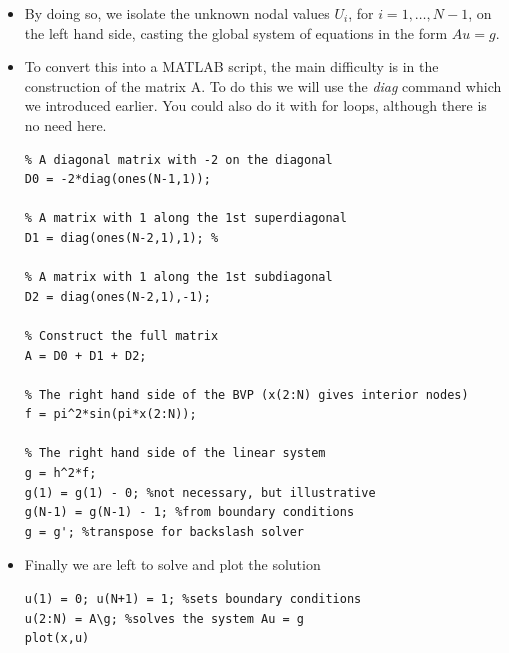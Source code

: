\documentclass[12pt]{report}
\begin{document}
\begin{itemize}
\begin{displaymath}
\begin{matrix}
f_2 \\
f_3 \\
\vdots \\
f_{N-3} \\
f_{N-2} \\
f_{N-1} \\
\end{matrix}\right) - 
u(0)\left(\begin{matrix}
1 \\
0 \\
0 \\
\vdots \\
0 \\
0 \\
0 \\
\end{matrix}\right) - 
u(1)\left(\begin{matrix}
0 \\
0 \\
0 \\
\vdots \\
0 \\
0 \\
1 \\
\end{matrix}\right)
\end{displaymath}
\item By doing so, we isolate the unknown nodal values $U_i$, for $i = 1,\ldots,N−1$, on the left hand side, casting the global system of equations in the form $Au = g$.
\item To convert this into a MATLAB script, the main difficulty is in the construction of the matrix A. To do this we will use the \textit{diag} command which we introduced earlier. You could also do it with for loops, although there is no need here.
\begin{lstlisting}
% A diagonal matrix with -2 on the diagonal
D0 = -2*diag(ones(N-1,1));

% A matrix with 1 along the 1st superdiagonal
D1 = diag(ones(N-2,1),1); %

% A matrix with 1 along the 1st subdiagonal
D2 = diag(ones(N-2,1),-1);

% Construct the full matrix
A = D0 + D1 + D2;

% The right hand side of the BVP (x(2:N) gives interior nodes)
f = pi^2*sin(pi*x(2:N));

% The right hand side of the linear system
g = h^2*f;
g(1) = g(1) - 0; %not necessary, but illustrative
g(N-1) = g(N-1) - 1; %from boundary conditions
g = g'; %transpose for backslash solver
\end{lstlisting}
\clearpage
\item Finally we are left to solve and plot the solution
\begin{lstlisting}
u(1) = 0; u(N+1) = 1; %sets boundary conditions 
u(2:N) = A\g; %solves the system Au = g
plot(x,u)
\end{lstlisting}


\end{itemize}
\end{document}

